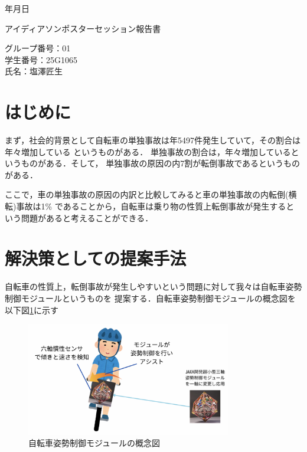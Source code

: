 \documentclass[uplatex]{jsarticle}
\begin{document}
\begin{flushright}
    \number\year 年\number\month 月\number\day 日
\end{flushright}

\begin{center}
    {\LARGE アイディアソンポスターセッション報告書}
\end{center}

\begin{flushright}
    グループ番号：01\\
    学生番号：25G1065\\
    氏名：塩澤匠生
\end{flushright}


\section{はじめに}
まず，社会的背景として自転車の単独事故は年5497件発生していて，その割合は年々増加している
というものがある\cite{jikokensuu}．
単独事故の割合は，年々増加しているというものがある．そして，
単独事故の原因の内7割が転倒事故であるというものがある\cite{tandokuWariai}．



ここで，車の単独事故の原因の内訳と比較してみると車の単独事故の内転倒(横転)事故は1\%
であることから，自転車は乗り物の性質上転倒事故が発生するという問題があると考えることができる．



\section{解決策としての提案手法}
自転車の性質上，転倒事故が発生しやすいという問題に対して我々は自転車姿勢制御モジュールというものを
提案する．自転車姿勢制御モジュールの概念図を以下図\ref{fig:moduleGainenn}に示す

\begin{figure}[H]
    \centering
    \includegraphics[width=0.8\textwidth]{fig/moduleGainenn.png}
    \caption{自転車姿勢制御モジュールの概念図}
    \label{fig:moduleGainenn}
\end{figure}
\end{document}
